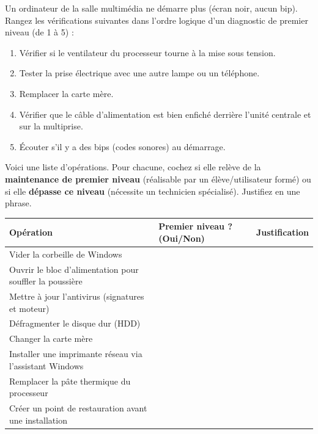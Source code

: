 \documentclass[11pt]{article}
\newcounter{popsec}
\newcounter{popsub}
\newcommand{\courssub}[1]{%
  \stepcounter{popsub}%
  \par\vspace{9pt}\noindent{\popxbold\fontsize{11.5}{13}\selectfont\color{popink}{\color{poporange}\thepopsec.\thepopsub}\hspace{6pt}#1}\par\nopagebreak\vspace{4pt}
}
\begin{document}
\begin{exercice}
Un ordinateur de la salle multimédia ne démarre plus (écran noir, aucun bip). Rangez les vérifications suivantes dans l'ordre logique d'un diagnostic de premier niveau (de 1 à 5) :
\begin{enumerate}
    \item Vérifier si le ventilateur du processeur tourne à la mise sous tension.
    \item Tester la prise électrique avec une autre lampe ou un téléphone.
    \item Remplacer la carte mère.
    \item Vérifier que le câble d'alimentation est bien enfiché derrière l'unité centrale et sur la multiprise.
    \item Écouter s'il y a des bips (codes sonores) au démarrage.
\end{enumerate}
\end{exercice}

\courssub{Je m'entraîne}

\begin{exercice}
Voici une liste d'opérations. Pour chacune, cochez si elle relève de la \textbf{maintenance de premier niveau} (réalisable par un élève/utilisateur formé) ou si elle \textbf{dépasse ce niveau} (nécessite un technicien spécialisé). Justifiez en une phrase.
\begin{center}
\begin{tabularx}{\linewidth}{|l|X|X|}
\hline
\textbf{Opération} & \textbf{Premier niveau ? (Oui/Non)} & \textbf{Justification} \\
\hline
Vider la corbeille de Windows & & \\
\hline
Ouvrir le bloc d'alimentation pour souffler la poussière & & \\
\hline
Mettre à jour l'antivirus (signatures et moteur) & & \\
\hline
Défragmenter le disque dur (HDD) & & \\
\hline
Changer la carte mère & & \\
\hline
Installer une imprimante réseau via l'assistant Windows & & \\
\hline
Remplacer la pâte thermique du processeur & & \\
\hline
Créer un point de restauration avant une installation & & \\
\hline
\end{tabularx}
\end{center}
\end{exercice}
\end{document}
